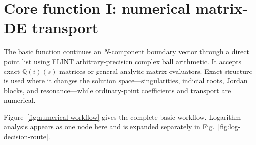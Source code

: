 \documentclass[11pt]{article}
\renewcommand{\_}{\origunderscore\allowbreak}
\begin{document}
\section{Core function I: numerical matrix-DE transport}
\label{sec:numerical-core}

The basic function continues an $N$-component boundary vector through a direct point list
using FLINT arbitrary-precision complex ball arithmetic.  It accepts exact
$\mathbb Q(i)(s)$ matrices or general analytic matrix evaluators.  Exact structure is used
where it changes the solution space---singularities, indicial roots, Jordan blocks, and
resonance---while ordinary-point coefficients and transport are numerical.

Figure~\ref{fig:numerical-workflow} gives the complete basic workflow.  Logarithm analysis
appears as one node here and is expanded separately in Fig.~\ref{fig:log-decision-route}.
\end{document}
